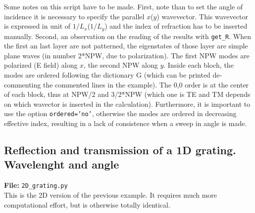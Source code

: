 \documentclass[a4paper,10pt]{report}
\begin{document}
Some notes on this script have to be made. First, note than to set the angle of incidence it is necessary to specify the parallel $x$($y$) wavevector. This wavevector is expressed in unit of $1/L_x$($1/L_y$) and the index of refraction has to be inserted manually.
Second, an observation on the reading of the results with \texttt{get\_R}. When the first an last layer are not patterned, the eigenstates of those layer are simple plane waves (in number 2*NPW, due to polarization). The first NPW modes are polarized (E field) along $x$, the second NPW along $y$. Inside each bloch, the modes are ordered following the dictionary G (which can be printed de-commenting the commented lines in the example). The 0,0 order is at the center of each block, thus at NPW/2 and 3/2*NPW (which one is TE and TM depends on which wavector is inserted in the calculation). Furthermore, it is important to use the option \texttt{ordered='no'}, otherwise the modes are ordered in decreasing effective index, resulting in a lack of consistence when a sweep in angle is made.  

\subsection{Reflection and transmission of a 1D grating. Wavelenght and angle}
\textbf{File:} \texttt{2D\_grating.py} \\
This is the 2D version of the previous example. It requires much more computational effort, but is otherwise totally identical.
\end{document}
